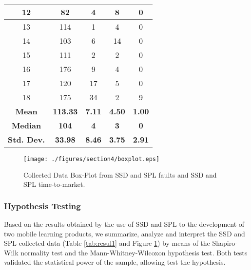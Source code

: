 \begin{table}
\begin{tabular}{c|c|c|c|c}
12                                  & 82              & 4               & 8              & 0                                              \\ \hline
13                                  & 114             & 1               & 4              & 0                                             \\ \hline
14                                  & 103             & 6               & 14             & 0                                            \\ \hline
15                                  & 111             & 2               & 2              & 0                                              \\ \hline
16                                  & 176             & 9               & 4              & 0                                              \\ \hline
17                                  & 120             & 17              & 5              & 0                                             \\ \hline
18                                  & 175             & 34              & 2              & 9                                              \\ \hline
\textbf{Mean}                       & \textbf{113.33} & \textbf{7.11}   & \textbf{4.50}  & \textbf{1.00}                 \\ \cline{1-5}
\textbf{Median}                     & \textbf{104}    & \textbf{4}      & \textbf{3}     & \textbf{0}                                      \\ \cline{1-5}
\textbf{Std. Dev.}                  & \textbf{33.98}  & \textbf{8.46}   & \textbf{3.75}  & \textbf{2.91}                             \\ \hline
\end{tabular}
\end{table}


\begin{figure}
\centering
\texttt{[image: ./figures/section4/boxplot.eps]}
\centering
\caption{Collected Data Box-Plot from SSD and SPL faults and SSD and SPL time-to-market.}
\label{fig:boxplot}
\end{figure}

\subsubsection{Hypothesis Testing}

Based on the results obtained by the use of SSD and SPL to the development of two mobile learning products, we summarize, analyze and interpret the SSD and SPL collected data (Table \ref{tab:resul1} and Figure \ref{fig:boxplot}) by means of the Shapiro-Wilk normality test and the Mann-Whitney-Wilcoxon hypothesis test. Both tests validated the statistical power of the sample, allowing test the hypothesis.

